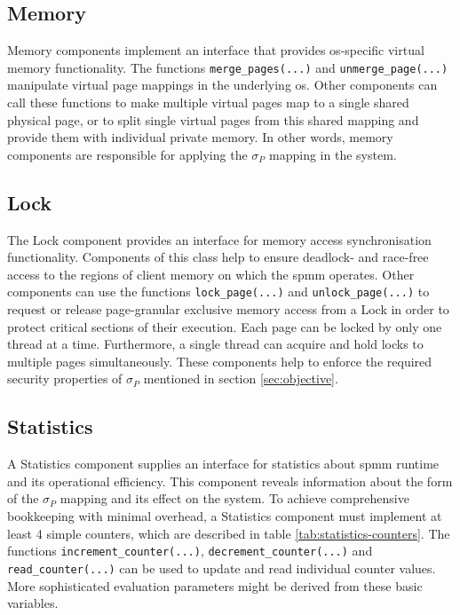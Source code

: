 \subsection*{Memory}
\label{subsec:Memory}

Memory components implement an interface that provides \ac{os}-specific virtual memory functionality.
The functions \texttt{merge\_pages(...)} and \texttt{unmerge\_page(...)} manipulate virtual page mappings in the underlying \ac{os}.
Other components can call these functions to make multiple virtual pages map to a single shared physical page, or to split single virtual pages from this shared mapping and provide them with individual private memory.
In other words, memory components are responsible for applying the $\sigma_P$ mapping in the system.

\subsection*{Lock}
\label{subsec:Lock}

The Lock component provides an interface for memory access synchronisation functionality.
Components of this class help to ensure deadlock- and race-free access to the regions of client memory on which the \ac{spmm} operates.
Other components can use the functions \texttt{lock\_page(...)} and \texttt{unlock\_page(...)} to request or release page-granular exclusive memory access from a Lock in order to protect critical sections of their execution.
Each page can be locked by only one thread at a time.
Furthermore, a single thread can acquire and hold locks to multiple pages simultaneously.
These components help to enforce the required security properties of $\sigma_P$ mentioned in section \ref{sec:objective}.

\subsection*{Statistics}
\label{subsec:statistics}

A Statistics component supplies an interface for statistics about \ac{spmm} runtime and its operational efficiency.
This component reveals information about the form of the $\sigma_P$ mapping and its effect on the system.
To achieve comprehensive bookkeeping with minimal overhead, a Statistics component must implement at least 4 simple counters, which are described in table \ref{tab:statistics-counters}.
The functions \texttt{increment\_counter(...)}, \texttt{decrement\_counter(...)} and \texttt{read\_counter(...)} can be used to update and read individual counter values.
More sophisticated evaluation parameters might be derived from these basic variables.

